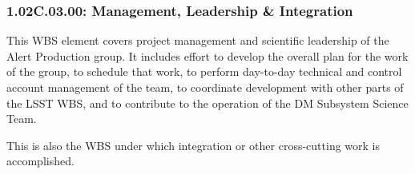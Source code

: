 \subsubsection{1.02C.03.00: Management, Leadership \& Integration}

This WBS element covers project management and scientific leadership of the
Alert Production group. It includes effort to develop the overall plan
for the work of the group, to schedule that work, to perform day-to-day
technical and control account management of the team, to coordinate
development with other parts of the LSST WBS, and to contribute to the
operation of the DM Subsystem Science Team.

This is also the WBS under which integration or other cross-cutting work
is accomplished. 
